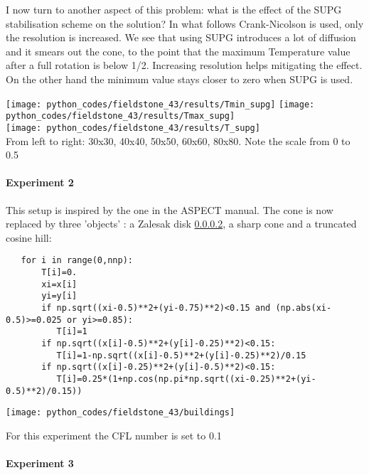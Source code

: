 I now turn to another aspect of this problem: what is the effect of the SUPG stabilisation 
scheme on the solution? In what follows Crank-Nicolson is used, only the resolution is increased. 
We see that using SUPG introduces a lot of diffusion and it smears out the cone, to the 
point that the maximum Temperature value after a full rotation is below 1/2. Increasing resolution 
helps mitigating the effect.
On the other hand the minimum value stays closer to zero when SUPG is used. 

\begin{center}
\texttt{[image: python\_codes/fieldstone\_43/results/Tmin\_supg]}
\texttt{[image: python\_codes/fieldstone\_43/results/Tmax\_supg]}\\
\texttt{[image: python\_codes/fieldstone\_43/results/T\_supg]}\\
{\captionfont From left to right: 30x30, 40x40, 50x50, 60x60, 80x80. Note the scale from 0 to 0.5}
\end{center}

\paragraph{Experiment 2}

This setup is inspired by the one in the ASPECT manual. The cone is now replaced by three 
'objects' : a Zalesak disk \ref{}, a sharp cone and a truncated cosine hill:

\begin{lstlisting}
   for i in range(0,nnp):
       T[i]=0.
       xi=x[i]
       yi=y[i]
       if np.sqrt((xi-0.5)**2+(yi-0.75)**2)<0.15 and (np.abs(xi-0.5)>=0.025 or yi>=0.85):
          T[i]=1
       if np.sqrt((x[i]-0.5)**2+(y[i]-0.25)**2)<0.15:
          T[i]=1-np.sqrt((x[i]-0.5)**2+(y[i]-0.25)**2)/0.15
       if np.sqrt((x[i]-0.25)**2+(y[i]-0.5)**2)<0.15:
          T[i]=0.25*(1+np.cos(np.pi*np.sqrt((xi-0.25)**2+(yi-0.5)**2)/0.15))
\end{lstlisting}

\begin{center}
\texttt{[image: python\_codes/fieldstone\_43/buildings]}
\end{center}

For this experiment the CFL number is set to 0.1

\paragraph{Experiment 3}




